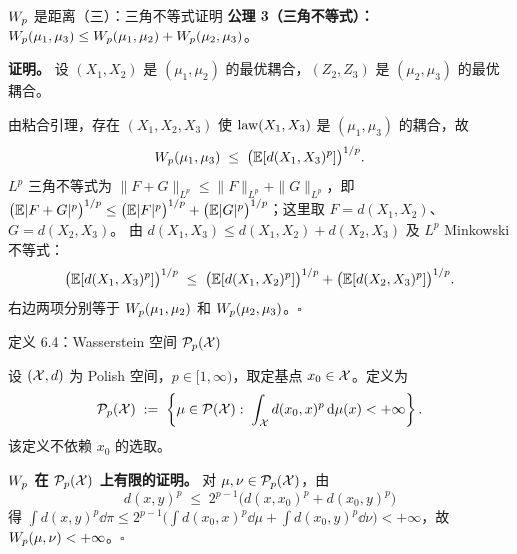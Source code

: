 \begin{frame}{$W_{p}$ 是距离（三）：三角不等式证明}
  \textbf{公理 3（三角不等式）：} $W_{p}(\mu_{1},\mu_{3})\le W_{p}(\mu_{1},\mu_{2})+W_{p}(\mu_{2},\mu_{3})$。\proofskipnote

  \textbf{证明。}
  设 $(X_{1},X_{2})$ 是 $(\mu_{1},\mu_{2})$ 的最优耦合，$(Z_{2},Z_{3})$ 是 $(\mu_{2},\mu_{3})$ 的最优耦合。

  由粘合引理，存在 $(X_{1},X_{2},X_{3})$ 使 $\operatorname{law}(X_{1},X_{3})$ 是 $(\mu_{1},\mu_{3})$ 的耦合，故
  \[
    W_{p}(\mu_{1},\mu_{3})
    \;\le\; \bigl(\mathbb{E}[d(X_{1},X_{3})^{p}]\bigr)^{1/p}.
  \]
   $L^{p}$ 三角不等式为 $\|F+G\|_{L^{p}}\le\|F\|_{L^{p}}+\|G\|_{L^{p}}$，即 $\bigl(\mathbb{E}|F+G|^{p}\bigr)^{1/p}\le\bigl(\mathbb{E}|F|^{p}\bigr)^{1/p}+\bigl(\mathbb{E}|G|^{p}\bigr)^{1/p}$；这里取 $F=d(X_{1},X_{2})$、$G=d(X_{2},X_{3})$。
  由 $d(X_{1},X_{3})\le d(X_{1},X_{2})+d(X_{2},X_{3})$ 及 $L^{p}$ Minkowski 不等式：
  \[
    \bigl(\mathbb{E}[d(X_{1},X_{3})^{p}]\bigr)^{1/p}
    \;\le\; \bigl(\mathbb{E}[d(X_{1},X_{2})^{p}]\bigr)^{1/p}
           + \bigl(\mathbb{E}[d(X_{2},X_{3})^{p}]\bigr)^{1/p}.
  \]
  右边两项分别等于 $W_{p}(\mu_{1},\mu_{2})$ 和 $W_{p}(\mu_{2},\mu_{3})$。$\square$

\end{frame}

\begin{frame}{定义 6.4：Wasserstein 空间 $\mathcal{P}_{p}(\mathcal{X})$}

  设 $(\mathcal{X},d)$ 为 Polish 空间，$p\in[1,\infty)$，取定基点 $x_{0}\in\mathcal{X}$。定义为
  \[
    \mathcal{P}_{p}(\mathcal{X}) \;:=\;
    \left\{\mu\in\mathcal{P}(\mathcal{X}):\; \int_{\mathcal{X}} d(x_{0},x)^{p}\,\mathrm{d}\mu(x) < +\infty\right\}.
  \]
  该定义不依赖 $x_{0}$ 的选取。

  \textbf{$W_{p}$ 在 $\mathcal{P}_{p}(\mathcal{X})$ 上有限的证明。} 对 $\mu,\nu\in\mathcal{P}_{p}(\mathcal{X})$，由
  \[
    d(x,y)^{p} \;\le\; 2^{p-1}\bigl(d(x,x_{0})^{p}+d(x_{0},y)^{p}\bigr)
  \]
  得 $\int d(x,y)^{p}\dd\pi\le 2^{p-1}\bigl(\int d(x_{0},x)^{p}\dd\mu+\int d(x_{0},y)^{p}\dd\nu\bigr)<+\infty$，故 $W_{p}(\mu,\nu)<+\infty$。$\square$

\end{frame}

